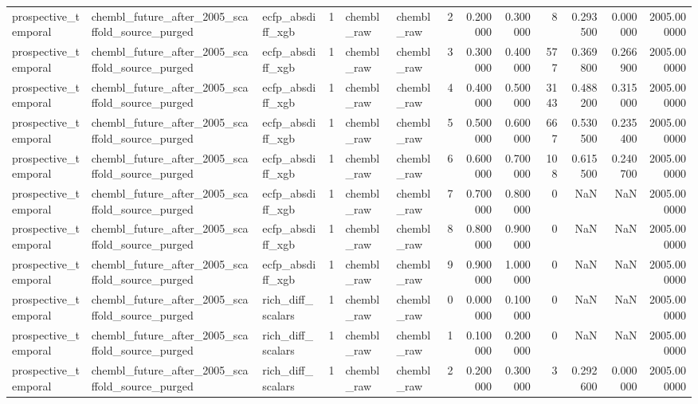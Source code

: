 \begin{longtable}{lllrllrrrrrrr}
prospective\_temporal & chembl\_future\_after\_2005\_scaffold\_source\_purged & ecfp\_absdiff\_xgb & 1 & chembl\_raw & chembl\_raw & 2 & 0.200000 & 0.300000 & 8 & 0.293500 & 0.000000 & 2005.000000 \\
prospective\_temporal & chembl\_future\_after\_2005\_scaffold\_source\_purged & ecfp\_absdiff\_xgb & 1 & chembl\_raw & chembl\_raw & 3 & 0.300000 & 0.400000 & 577 & 0.369800 & 0.266900 & 2005.000000 \\
prospective\_temporal & chembl\_future\_after\_2005\_scaffold\_source\_purged & ecfp\_absdiff\_xgb & 1 & chembl\_raw & chembl\_raw & 4 & 0.400000 & 0.500000 & 3143 & 0.488200 & 0.315000 & 2005.000000 \\
prospective\_temporal & chembl\_future\_after\_2005\_scaffold\_source\_purged & ecfp\_absdiff\_xgb & 1 & chembl\_raw & chembl\_raw & 5 & 0.500000 & 0.600000 & 667 & 0.530500 & 0.235400 & 2005.000000 \\
prospective\_temporal & chembl\_future\_after\_2005\_scaffold\_source\_purged & ecfp\_absdiff\_xgb & 1 & chembl\_raw & chembl\_raw & 6 & 0.600000 & 0.700000 & 108 & 0.615500 & 0.240700 & 2005.000000 \\
prospective\_temporal & chembl\_future\_after\_2005\_scaffold\_source\_purged & ecfp\_absdiff\_xgb & 1 & chembl\_raw & chembl\_raw & 7 & 0.700000 & 0.800000 & 0 & NaN & NaN & 2005.000000 \\
prospective\_temporal & chembl\_future\_after\_2005\_scaffold\_source\_purged & ecfp\_absdiff\_xgb & 1 & chembl\_raw & chembl\_raw & 8 & 0.800000 & 0.900000 & 0 & NaN & NaN & 2005.000000 \\
prospective\_temporal & chembl\_future\_after\_2005\_scaffold\_source\_purged & ecfp\_absdiff\_xgb & 1 & chembl\_raw & chembl\_raw & 9 & 0.900000 & 1.000000 & 0 & NaN & NaN & 2005.000000 \\
prospective\_temporal & chembl\_future\_after\_2005\_scaffold\_source\_purged & rich\_diff\_scalars & 1 & chembl\_raw & chembl\_raw & 0 & 0.000000 & 0.100000 & 0 & NaN & NaN & 2005.000000 \\
prospective\_temporal & chembl\_future\_after\_2005\_scaffold\_source\_purged & rich\_diff\_scalars & 1 & chembl\_raw & chembl\_raw & 1 & 0.100000 & 0.200000 & 0 & NaN & NaN & 2005.000000 \\
prospective\_temporal & chembl\_future\_after\_2005\_scaffold\_source\_purged & rich\_diff\_scalars & 1 & chembl\_raw & chembl\_raw & 2 & 0.200000 & 0.300000 & 3 & 0.292600 & 0.000000 & 2005.000000 \\

\end{longtable}
